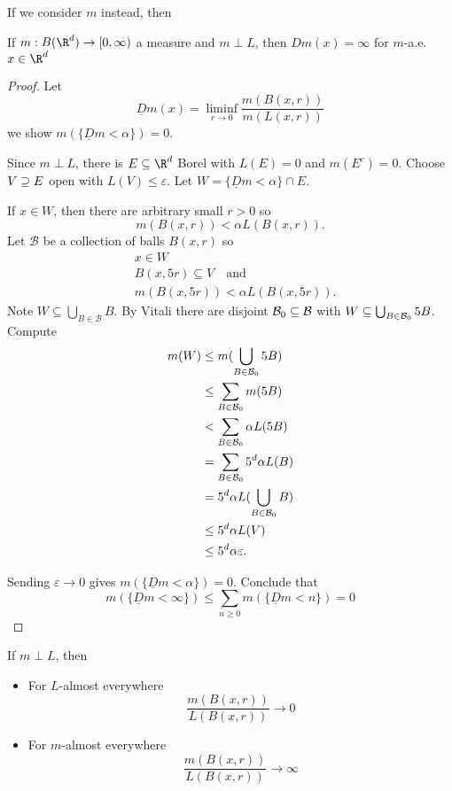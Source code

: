 If we consider $m$ instead, then

\begin{theorem}
	If $m: B(\R^d) \to [0,\infty)$ a measure and $m \perp L$, then $D m(x) = \infty$ for  $m$-a.e. $x\in \R^d$
\end{theorem}

\begin{proof}
Let
\[
	\underline{D} m(x) = \liminf_{r \to 0} \frac{m(B(x,r))}{m(L(x,r))}
\]
we show $m(\{ \underline{D} m < \alpha \}) = 0$.

Since $m \perp L$, there is $E \subseteq \R^d$ Borel with $L(E) = 0$ and $m(E^c) = 0$.
Choose $V \supseteq E$ open with $L(V) \leq \varepsilon$. Let $W = \{ \underline{D} m < \alpha \} \cap E$.

\noindent If  $x \in W$, then there are arbitrary small  $r > 0$ so
\[
	m(B(x,r)) < \alpha L(B(x,r)).
\]
Let $\mathcal{B}$ be a collection of balls $B(x,r)$ so
\begin{align*}
	&x \in W \\
	&B(x,5r) \subseteq V \quad \text{and} \\
	&m(B(x,5r)) < \alpha L(B(x,5r)).
\end{align*}
Note $W \subseteq \bigcup_{B \in \mathcal{B}} B$. By Vitali there are disjoint
$\mathcal{B}_0 \subseteq \mathcal{B}$ with $W \subseteq \bigcup_{B \in \mathcal{B}_{0}} 5B$.
Compute
\begin{align*}
	m(W) &\leq m( \bigcup_{B \in \mathcal{B}_{0}} 5B) \\
		 &\leq \sum_{B \in \mathcal{B}_0} m(5B) \\
		 &< \sum_{B \in \mathcal{B}_{0}} \alpha L(5B) \\
		 &= \sum_{B \in \mathcal{B}_0} 5^d \alpha L(B) \\ 
		 &= 5^d \alpha L(\bigcup_{B \in \mathcal{B}_0} B) \\
		 &\leq 5^d \alpha L(V) \\ 
		 &\leq 5^d \alpha \varepsilon.
\end{align*}

Sending $\varepsilon \to 0$ gives $m(\{ \underline{D} m < \alpha \} ) = 0$.
Conclude that
\[
	 m(\{ \underline{D} m < \infty\}) \leq \sum_{n \geq 0} m (\{ \underline{D} m < n \} ) = 0
\]
\end{proof}

\begin{remark}
	If $m \perp L$, then
	\begin{itemize}
		\item For $L$-almost everywhere
			\[
				\frac{m(B(x,r))}{L(B(x,r))} \to 0 
			\]
		\item For $m$-almost everywhere
			\[
				\frac{m(B(x,r))}{L(B(x,r))} \to \infty 
			\]
	\end{itemize}
\end{remark}

